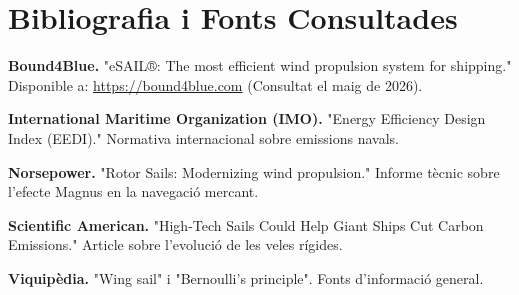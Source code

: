 \chapter{Bibliografia i Fonts Consultades}

\begin{enumerate}[label={[\arabic*]}]
    \item \textbf{Bound4Blue.} "eSAIL®: The most efficient wind propulsion system for shipping." Disponible a: \url{https://bound4blue.com} (Consultat el maig de 2026).
    \item \textbf{International Maritime Organization (IMO).} "Energy Efficiency Design Index (EEDI)." Normativa internacional sobre emissions navals.
    \item \textbf{Norsepower.} "Rotor Sails: Modernizing wind propulsion." Informe tècnic sobre l'efecte Magnus en la navegació mercant.
    \item \textbf{Scientific American.} "High-Tech Sails Could Help Giant Ships Cut Carbon Emissions." Article sobre l'evolució de les veles rígides.
    \item \textbf{Viquipèdia.} "Wing sail" i "Bernoulli's principle". Fonts d'informació general.
\end{enumerate}

